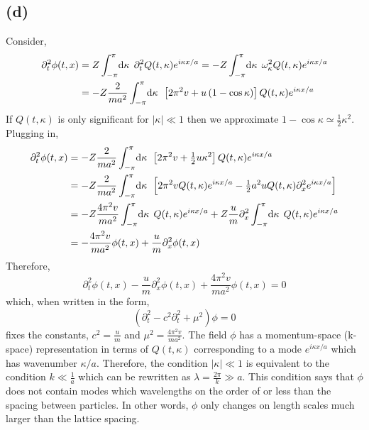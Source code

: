 \documentclass[12pt]{extarticle}
\begin{document}
\subsection*{(d)}
Consider,
\begin{align*} 
\partial_t^2 \phi(t, x) & = Z \int_{-\pi}^\pi \! \mathrm{d}\kappa \: \: \partial_t^2 Q(t, \kappa) e^{i \kappa x / a} = - Z \int_{-\pi}^\pi \! \mathrm{d}\kappa \: \: \omega_\kappa^2 Q(t, \kappa) e^{i \kappa x / a} \\
& = - Z \frac{2}{m a^2} \int_{-\pi}^\pi \! \mathrm{d}\kappa \: \: \left[2 \pi^2 v + u \left(1 - \cos{\kappa}\right) \right] Q(t, \kappa) e^{i \kappa x / a}
\end{align*}
If $Q(t, \kappa)$ is only significant for $|\kappa| \ll 1$ then we approximate $1 - \cos{\kappa} \simeq \frac{1}{2} \kappa^2$. Plugging in,
\begin{align*}
\partial_t^2 \phi(t, x) & = - Z \frac{2}{m a^2} \int_{-\pi}^\pi \! \mathrm{d}\kappa \: \: \left[ 2 \pi^2 v + \tfrac{1}{2} u \kappa^2 \right] Q(t, \kappa) e^{i \kappa x / a} \\
& = - Z \frac{2}{m a^2} \int_{-\pi}^\pi \! \mathrm{d}\kappa \: \: \left[ 2 \pi^2 v Q(t, \kappa) e^{i \kappa x / a}  - \tfrac{1}{2} a ^2 u Q(t, \kappa) \partial_x^2  e^{i \kappa x / a} \right] \\
& = - Z \frac{4 \pi^2 v}{m a^2} \int_{-\pi}^\pi \! \mathrm{d}\kappa \: \: Q(t, \kappa) e^{i \kappa x / a}  + Z \frac{u}{m} \partial_x^2 \int_{-\pi}^\pi \! \mathrm{d}\kappa \: \:  Q(t, \kappa)  e^{i \kappa x / a} \\
& = - \frac{4 \pi^2 v}{m a^2} \phi(t, x) + \frac{u}{m} \partial_x^2 \phi(t, x)
\end{align*} 
Therefore,
\[ \partial_t^2 \phi(t, x) - \frac{u}{m} \partial_x^2 \phi(t, x) + \frac{4 \pi^2 v}{m a^2} \phi(t, x) = 0\]
which, when written in the form,
\[\left( \partial_t^2 - c^2 \partial_t^2 + \mu^2 \right) \phi = 0\]
fixes the constants, $c^2 = \frac{u}{m}$ and $\mu^2 = \frac{4 \pi^2 v}{m a^2}$. The field $\phi$ has a momentum-space (k-space) representation in terms of $Q(t, \kappa)$ corresponding to a mode $e^{i \kappa x /a}$ which has wavenumber $\kappa/a$. Therefore, the condition $|\kappa| \ll 1$ is equivalent to the condition $k \ll \frac{1}{a}$ which can be rewritten as $\lambda = \frac{2 \pi}{k} \gg a$. This condition says that $\phi$ does not contain modes which wavelengths on the order of or less than the spacing between particles. In other words, $\phi$ only changes on length scales much larger than the lattice spacing. 
\end{document}
